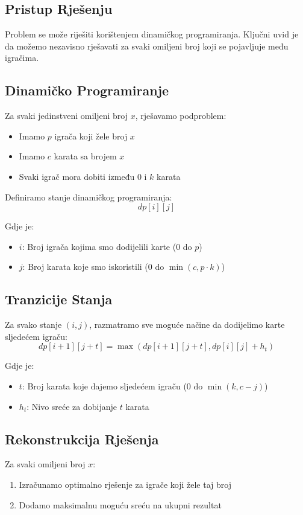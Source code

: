 \subsection{Pristup Rješenju}
Problem se može riješiti korištenjem dinamičkog programiranja. Ključni uvid je da možemo nezavisno rješavati za svaki omiljeni broj koji se pojavljuje među igračima.

\subsection{Dinamičko Programiranje}
Za svaki jedinstveni omiljeni broj $x$, rješavamo podproblem:
\begin{itemize}
    \item Imamo $p$ igrača koji žele broj $x$
    \item Imamo $c$ karata sa brojem $x$
    \item Svaki igrač mora dobiti između 0 i $k$ karata
\end{itemize}

Definiramo stanje dinamičkog programiranja:
\begin{equation*}
dp[i][j]
\end{equation*}

Gdje je:
\begin{itemize}
    \item $i$: Broj igrača kojima smo dodijelili karte (0 do $p$)
    \item $j$: Broj karata koje smo iskoristili (0 do $\min(c, p \cdot k)$)
\end{itemize}

\subsection{Tranzicije Stanja}
Za svako stanje $(i,j)$, razmatramo sve moguće načine da dodijelimo karte sljedećem igraču:
\begin{equation*}
dp[i+1][j+t] = \max(dp[i+1][j+t], dp[i][j] + h_t)
\end{equation*}

Gdje je:
\begin{itemize}
    \item $t$: Broj karata koje dajemo sljedećem igraču (0 do $\min(k, c-j)$)
    \item $h_t$: Nivo sreće za dobijanje $t$ karata
\end{itemize}

\subsection{Rekonstrukcija Rješenja}
Za svaki omiljeni broj $x$:
\begin{enumerate}
    \item Izračunamo optimalno rješenje za igrače koji žele taj broj
    \item Dodamo maksimalnu moguću sreću na ukupni rezultat
\end{enumerate}

